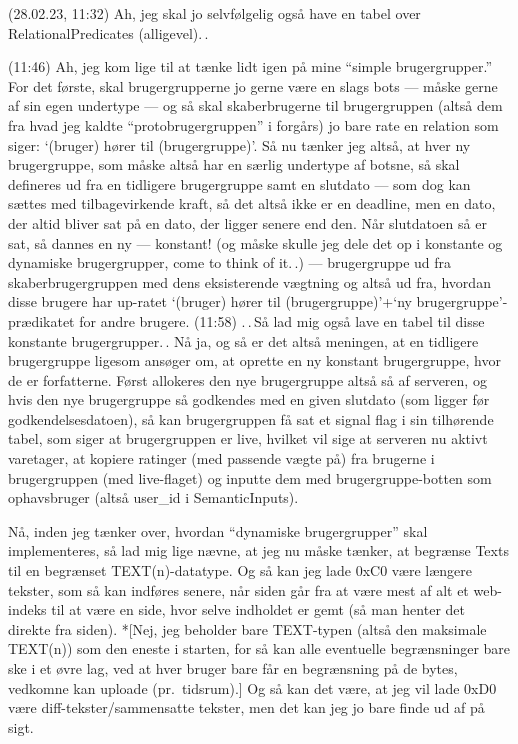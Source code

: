 \documentclass{report}
\begin{document}
(28.02.23, 11:32) Ah, jeg skal jo selvfølgelig også have en tabel over RelationalPredicates (alligevel).\,.

(11:46) Ah, jeg kom lige til at tænke lidt igen på mine ``simple brugergrupper.'' For det første, skal brugergrupperne jo gerne være en slags bots --- måske gerne af sin egen undertype --- og så skal skaberbrugerne til brugergruppen (altså dem fra hvad jeg kaldte ``protobrugergruppen'' i forgårs) jo bare rate en relation som siger: `(bruger) hører til (brugergruppe)'.  Så nu tænker jeg altså, at hver ny brugergruppe, som måske altså har en særlig undertype af botsne, så skal defineres ud fra en tidligere brugergruppe samt en slutdato --- som dog kan sættes med tilbagevirkende kraft, så det altså ikke er en deadline, men en dato, der altid bliver sat på en dato, der ligger senere end den. Når slutdatoen så er sat, så dannes en ny --- konstant! (og måske skulle jeg dele det op i konstante og dynamiske brugergrupper, come to think of it.\,.) --- brugergruppe ud fra skaberbrugergruppen med dens eksisterende vægtning og altså ud fra, hvordan disse brugere har up-ratet `(bruger) hører til (brugergruppe)'+`ny brugergruppe'-prædikatet for andre brugere. (11:58) .\,.\,Så lad mig også lave en tabel til disse konstante brugergrupper.\,. Nå ja, og så er det altså meningen, at en tidligere brugergruppe ligesom ansøger om, at oprette en ny konstant brugergruppe, hvor de er forfatterne. Først allokeres den nye brugergruppe altså så af serveren, og hvis den nye brugergruppe så godkendes med en given slutdato (som ligger før godkendelsesdatoen), så kan brugergruppen få sat et signal flag i sin tilhørende tabel, som siger at brugergruppen er live, hvilket vil sige at serveren nu aktivt varetager, at kopiere ratinger (med passende vægte på) fra brugerne i brugergruppen (med live-flaget) og inputte dem med brugergruppe-botten som ophavsbruger (altså user\_id i SemanticInputs). 

Nå, inden jeg tænker over, hvordan ``dynamiske brugergrupper'' skal implementeres, så lad mig lige nævne, at jeg nu måske tænker, at begrænse Texts til en begrænset TEXT(n)-datatype. Og så kan jeg lade 0xC0 være længere tekster, som så kan indføres senere, når siden går fra at være mest af alt et web-indeks til at være en side, hvor selve indholdet er gemt (så man henter det direkte fra siden). *[Nej, jeg beholder bare TEXT-typen (altså den maksimale TEXT(n)) som den eneste i starten, for så kan alle eventuelle begrænsninger bare ske i et øvre lag, ved at hver bruger bare får en begrænsning på de bytes, vedkomne kan uploade (pr.\ tidsrum).] Og så kan det være, at jeg vil lade 0xD0 være diff-tekster/sammensatte tekster, men det kan jeg jo bare finde ud af på sigt. 
\end{document}
